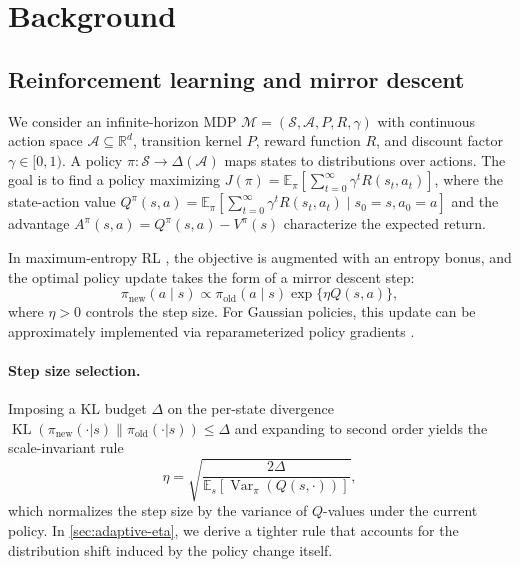 \documentclass{article}
\theoremstyle{plain}
\theoremstyle{definition}
\theoremstyle{remark}
\newcommand{\E}{\mathbb{E}}
\DeclareMathOperator{\KL}{KL}
\DeclareMathOperator{\Var}{Var}
\begin{document}
\section{Background}
\label{sec:background}

\subsection{Reinforcement learning and mirror descent}
\label{sec:rl-background}

We consider an infinite-horizon MDP $\mathcal{M} = (\mathcal{S}, \mathcal{A}, P, R, \gamma)$ with continuous action space $\mathcal{A} \subseteq \mathbb{R}^d$, transition kernel $P$, reward function $R$, and discount factor $\gamma \in [0,1)$.
A policy $\pi: \mathcal{S} \to \Delta(\mathcal{A})$ maps states to distributions over actions.
The goal is to find a policy maximizing $J(\pi) = \E_\pi[\sum_{t=0}^\infty \gamma^t R(s_t, a_t)]$, where the state-action value $Q^\pi(s,a) = \E_\pi[\sum_{t=0}^\infty \gamma^t R(s_t,a_t) \mid s_0{=}s, a_0{=}a]$ and the advantage $A^\pi(s,a) = Q^\pi(s,a) - V^\pi(s)$ characterize the expected return.

In maximum-entropy RL \citep{haarnoja2018sac}, the objective is augmented with an entropy bonus, and the optimal policy update takes the form of a mirror descent step:
\begin{equation}
  \pi_{\mathrm{new}}(a\mid s) \propto \pi_\mathrm{old}(a\mid s) \exp\{\eta Q(s,a)\},
  \label{eq:md-tilt}
\end{equation}
where $\eta > 0$ controls the step size.
For Gaussian policies, this update can be approximately implemented via reparameterized policy gradients \citep{haarnoja2018sac}.

\paragraph{Step size selection.}
Imposing a KL budget $\Delta$ on the per-state divergence $\KL(\pi_{\mathrm{new}}(\cdot|s) \| \pi_{\mathrm{old}}(\cdot|s)) \le \Delta$ and expanding to second order yields the scale-invariant rule
\begin{equation}
  \eta = \sqrt{\frac{2\Delta}{\E_{s}[\Var_{\pi}(Q(s,\cdot))]}},
  \label{eq:kl-budget-eta}
\end{equation}
which normalizes the step size by the variance of $Q$-values under the current policy.
In \cref{sec:adaptive-eta}, we derive a tighter rule that accounts for the distribution shift induced by the policy change itself.
\end{document}
